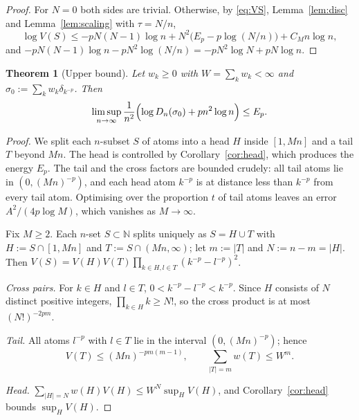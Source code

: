 \documentclass{amsart}
\newtheorem{theorem}{Theorem}[section]
\theoremstyle{definition}
\theoremstyle{remark}
\numberwithin{equation}{section}
\newcommand{\N}{\mathbb{N}}
\begin{document}
\begin{proof}
For $N=0$ both sides are trivial. Otherwise, by \eqref{eq:VS}, Lemma~\ref{lem:disc} and Lemma~\ref{lem:scaling} with
$\tau=N/n$,
\[
  \log V(S)\le-pN(N-1)\log n+N^2\bigl(E_p-p\log(N/n)\bigr)+C_Mn\log n,
\]
and $-pN(N-1)\log n-pN^2\log(N/n)=-pN^2\log N+pN\log n$.
\end{proof}

\begin{theorem}[Upper bound]\label{thm:upper}
Let $w_k\ge0$ with $W=\sum_kw_k<\infty$ and $\sigma_0:=\sum_kw_k\delta_{k^{-p}}$. Then
\[
  \limsup_{n\to\infty}\frac1{n^2}\Bigl(\log D_n(\sigma_0)+pn^2\log n\Bigr)\le E_p .
\]
\end{theorem}

\begin{proof}
We split each $n$-subset $S$ of atoms into a head $H$ inside $[1,Mn]$ and a tail $T$ beyond $Mn$. The head is
controlled by Corollary~\ref{cor:head}, which produces the energy $E_p$. The tail and the cross factors are bounded
crudely: all tail atoms lie in $(0,(Mn)^{-p})$, and each head atom $k^{-p}$ is at distance less than $k^{-p}$
from every tail atom.
Optimising over the proportion $t$ of tail atoms leaves an error $A^2/(4p\log M)$, which vanishes as $M\to\infty$.

Fix $M\ge2$. Each $n$-set $S\subset\N$ splits uniquely as $S=H\cup T$ with $H:=S\cap[1,Mn]$ and $T:=S\cap(Mn,\infty)$;
let $m:=|T|$ and $N:=n-m=|H|$. Then $V(S)=V(H)V(T)\prod_{k\in H,l\in T}(k^{-p}-l^{-p})^2$.

\emph{Cross pairs.} For $k\in H$ and $l\in T$, $0<k^{-p}-l^{-p}<k^{-p}$. Since $H$ consists of $N$ distinct positive
integers, $\prod_{k\in H}k\ge N!$, so the cross product is at most $(N!)^{-2pm}$.

\emph{Tail.} All atoms $l^{-p}$ with $l\in T$ lie in the interval $(0,(Mn)^{-p})$; hence
\[
  V(T)\le(Mn)^{-pm(m-1)},\qquad\sum_{|T|=m}w(T)\le W^m .
\]

\emph{Head.} $\sum_{|H|=N}w(H)V(H)\le W^N\sup_HV(H)$, and Corollary~\ref{cor:head} bounds $\sup_HV(H)$.


\end{proof}
\end{document}
